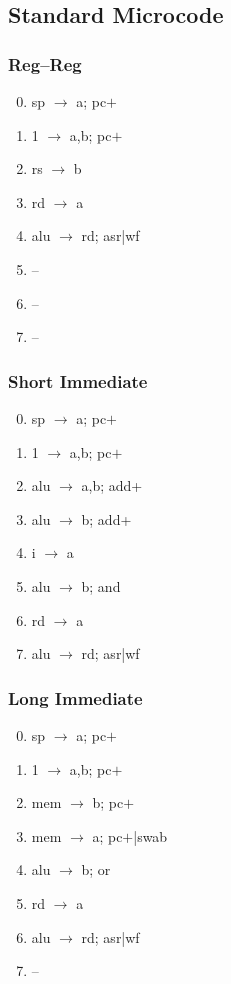 \documentclass[11pt]{book}
\begin{document}
\subsection*{Standard Microcode}
\begin{multicols}{3}\ttfamily\selectfont\small
  \subsubsection*{Reg--Reg}
  \begin{enumerate}\setcounter{enumi}{-1}
  \item sp \(\rightarrow\) a; pc\(+\)
  \item 1 \(\rightarrow\) a,b; pc\(+\)
  \item rs \(\rightarrow\) b
  \item rd \(\rightarrow\) a
  \item alu \(\rightarrow\) rd; asr|wf
  \item --
  \item --
  \item --
  \end{enumerate}
  \columnbreak
  \subsubsection*{Short Immediate}
  \begin{enumerate}\setcounter{enumi}{-1}
  \item sp \(\rightarrow\) a; pc\(+\)
  \item 1 \(\rightarrow\) a,b; pc\(+\)
  \item alu \(\rightarrow\) a,b; add+
  \item alu \(\rightarrow\) b; add+
  \item i \(\rightarrow\) a
  \item alu \(\rightarrow\) b; and
  \item rd \(\rightarrow\) a
  \item alu \(\rightarrow\) rd; asr|wf
  \end{enumerate}
  \columnbreak
  \subsubsection*{Long Immediate}
  \begin{enumerate}\setcounter{enumi}{-1}
  \item sp \(\rightarrow\) a; pc\(+\)
  \item 1 \(\rightarrow\) a,b; pc\(+\)
  \item mem \(\rightarrow\) b; pc\(+\)
  \item mem \(\rightarrow\) a; pc\(+\)|swab
  \item alu \(\rightarrow\) b; or
  \item rd \(\rightarrow\) a
  \item alu \(\rightarrow\) rd; asr|wf
  \item --
  \end{enumerate}
\end{multicols}
\end{document}
